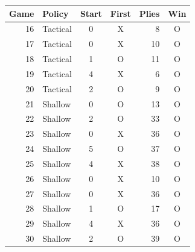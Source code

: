 \begin{tabular}{rlccrc}
\toprule
Game & Policy & Start & First & Plies & Win \\
\midrule
16 & Tactical & 0 & X & 8 & O \\
17 & Tactical & 0 & X & 10 & O \\
18 & Tactical & 1 & O & 11 & O \\
19 & Tactical & 4 & X & 6 & O \\
20 & Tactical & 2 & O & 9 & O \\
21 & Shallow & 0 & O & 13 & O \\
22 & Shallow & 2 & O & 33 & O \\
23 & Shallow & 0 & X & 36 & O \\
24 & Shallow & 5 & O & 37 & O \\
25 & Shallow & 4 & X & 38 & O \\
26 & Shallow & 0 & X & 10 & O \\
27 & Shallow & 0 & X & 36 & O \\
28 & Shallow & 1 & O & 17 & O \\
29 & Shallow & 4 & X & 36 & O \\
30 & Shallow & 2 & O & 39 & O \\
\bottomrule
\end{tabular}
